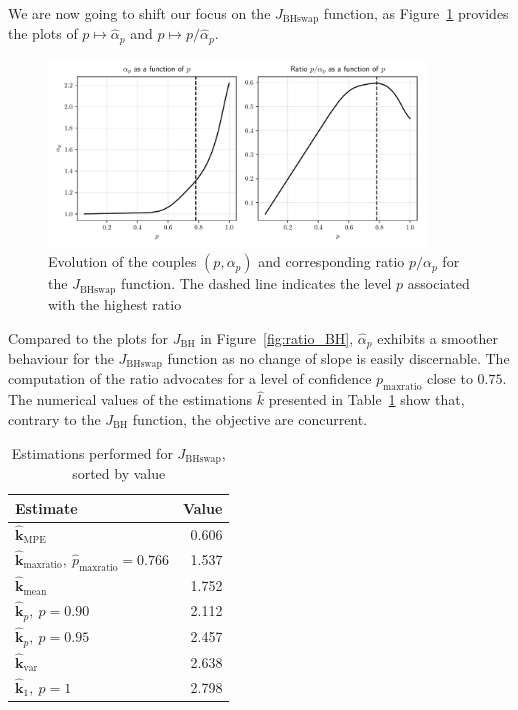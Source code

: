\documentclass[preprint, 1p]{elsarticle}
\newcommand{\kest}{\hat{\mathbf{k}}}
\newcommand{\checkap}{{\alpha}_p}
\newcommand{\checka}{{\alpha}}
\begin{document}
We are now going to shift our focus on the $J_{\mathrm{BHswap}}$ function, as Figure~\ref{fig:ratio_BHs} provides the plots of $p\mapsto \hat{\checka}_p$ and $p\mapsto p/\hat{\checka}_p$.
\begin{figure}[ht]
  \centering
\includegraphics[width=10cm]{Figures/alpha_p_BHs.pdf}
\caption{Evolution of the couples $(p,\checkap)$ and corresponding ratio $p/\checkap$ for the $J_{\mathrm{BHswap}}$ function. The dashed line indicates the level $p$ associated with the highest ratio}
\label{fig:ratio_BHs}
\end{figure}

Compared to the plots for $J_{\mathrm{BH}}$ in Figure~\ref{fig:ratio_BH}, $\hat{\checka}_p$ exhibits a smoother behaviour for the $J_{\mathrm{BHswap}}$ function as no change of slope is easily discernable. The computation of the ratio advocates for a level of confidence $p_{\mathrm{maxratio}}$ close to $0.75$. The numerical values of the estimations $\hat{k}$ presented in Table~\ref{tab:recap_estimates_BHs} show that, contrary to the $J_{\mathrm{BH}}$ function, the objective are concurrent.

\begin{table}[!h]
\centering
\caption{Estimations performed for $J_{\mathrm{BHswap}}$, sorted by value}
\label{tab:recap_estimates_BHs}
\begin{tabular}{lr} \toprule
Estimate & Value \\ \midrule
$\kest_{\mathrm{MPE}}$ & 0.606 \\ 
$\kest_{\mathrm{maxratio}},~ \hat{p}_{\mathrm{maxratio}}=0.766$ & 1.537 \\ 
$\kest_{\mathrm{mean}}$ & 1.752 \\ 
$\kest_p,~p=0.90$ & 2.112 \\ 
$\kest_p,~p=0.95$ & 2.457 \\ 
$\kest_{\mathrm{var}}$ & 2.638 \\ 
$\kest_1,~p=1$ & 2.798   \\ \bottomrule
\end{tabular}
\end{table}
\end{document}
